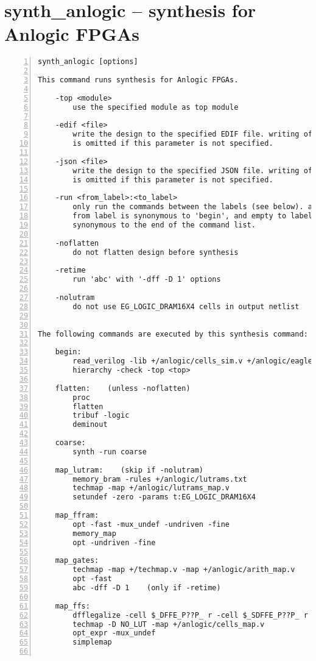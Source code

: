 \section{synth\_anlogic -- synthesis for Anlogic FPGAs}
\label{cmd:synth_anlogic}
\begin{lstlisting}[numbers=left,frame=single]
    synth_anlogic [options]

This command runs synthesis for Anlogic FPGAs.

    -top <module>
        use the specified module as top module

    -edif <file>
        write the design to the specified EDIF file. writing of an output file
        is omitted if this parameter is not specified.

    -json <file>
        write the design to the specified JSON file. writing of an output file
        is omitted if this parameter is not specified.

    -run <from_label>:<to_label>
        only run the commands between the labels (see below). an empty
        from label is synonymous to 'begin', and empty to label is
        synonymous to the end of the command list.

    -noflatten
        do not flatten design before synthesis

    -retime
        run 'abc' with '-dff -D 1' options

    -nolutram
        do not use EG_LOGIC_DRAM16X4 cells in output netlist


The following commands are executed by this synthesis command:

    begin:
        read_verilog -lib +/anlogic/cells_sim.v +/anlogic/eagle_bb.v
        hierarchy -check -top <top>

    flatten:    (unless -noflatten)
        proc
        flatten
        tribuf -logic
        deminout

    coarse:
        synth -run coarse

    map_lutram:    (skip if -nolutram)
        memory_bram -rules +/anlogic/lutrams.txt
        techmap -map +/anlogic/lutrams_map.v
        setundef -zero -params t:EG_LOGIC_DRAM16X4

    map_ffram:
        opt -fast -mux_undef -undriven -fine
        memory_map
        opt -undriven -fine

    map_gates:
        techmap -map +/techmap.v -map +/anlogic/arith_map.v
        opt -fast
        abc -dff -D 1    (only if -retime)

    map_ffs:
        dfflegalize -cell $_DFFE_P??P_ r -cell $_SDFFE_P??P_ r -cell $_DLATCH_N??_ r
        techmap -D NO_LUT -map +/anlogic/cells_map.v
        opt_expr -mux_undef
        simplemap


\end{lstlisting}
